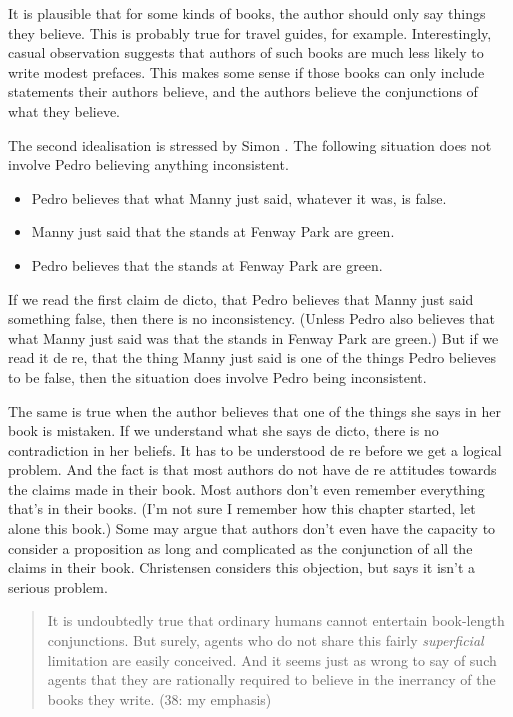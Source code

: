 \documentclass[11pt,]{book}
\providecommand{\tightlist}{%
  \setlength{\itemsep}{0pt}\setlength{\parskip}{0pt}}
\begin{document}
It is plausible that for some kinds of books, the author should only say things they believe. This is probably true for travel guides, for example. Interestingly, casual observation suggests that authors of such books are much less likely to write modest prefaces. This makes some sense if those books can only include statements their authors believe, and the authors believe the conjunctions of what they believe.

The second idealisation is stressed by Simon \citet{Evnine1999}. The following situation does not involve Pedro believing anything inconsistent.

\begin{itemize}
\tightlist
\item
  Pedro believes that what Manny just said, whatever it was, is false.
\item
  Manny just said that the stands at Fenway Park are green.
\item
  Pedro believes that the stands at Fenway Park are green.
\end{itemize}

If we read the first claim de dicto, that Pedro believes that Manny just said something false, then there is no inconsistency. (Unless Pedro also believes that what Manny just said was that the stands in Fenway Park are green.) But if we read it de re, that the thing Manny just said is one of the things Pedro believes to be false, then the situation does involve Pedro being inconsistent.

The same is true when the author believes that one of the things she says in her book is mistaken. If we understand what she says de dicto, there is no contradiction in her beliefs. It has to be understood de re before we get a logical problem. And the fact is that most authors do not have de re attitudes towards the claims made in their book. Most authors don't even remember everything that's in their books. (I'm not sure I remember how this chapter started, let alone this book.) Some may argue that authors don't even have the capacity to consider a proposition as long and complicated as the conjunction of all the claims in their book. Christensen considers this objection, but says it isn't a serious problem.

\begin{quote}
It is undoubtedly true that ordinary humans cannot entertain book-length conjunctions. But surely, agents who do not share this fairly \emph{superficial} limitation are easily conceived. And it seems just as wrong to say of such agents that they are rationally required to believe in the inerrancy of the books they write. (38: my emphasis)
\end{quote}
\end{document}
